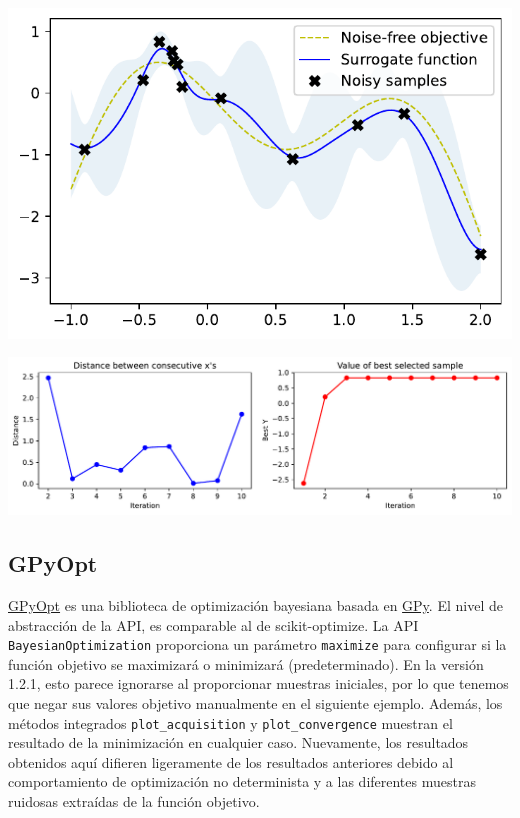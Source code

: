 \documentclass[
  12pt,
  letterpaper,
  DIV=11,
  numbers=noendperiod]{scrartcl}
\begin{document}
\includegraphics{ProyFinal_OptBayesiana_2024_files/figure-pdf/cell-8-output-1.pdf}

\includegraphics{ProyFinal_OptBayesiana_2024_files/figure-pdf/cell-9-output-1.pdf}

\subsection{GPyOpt}\label{gpyopt}

\href{http://sheffieldml.github.io/GPyOpt/}{GPyOpt} es una biblioteca de
optimización bayesiana basada en
\href{https://sheffieldml.github.io/GPy/}{GPy}. El nivel de abstracción
de la API, es comparable al de scikit-optimize. La API
\texttt{BayesianOptimization} proporciona un parámetro \texttt{maximize}
para configurar si la función objetivo se maximizará o minimizará
(predeterminado). En la versión 1.2.1, esto parece ignorarse al
proporcionar muestras iniciales, por lo que tenemos que negar sus
valores objetivo manualmente en el siguiente ejemplo. Además, los
métodos integrados \texttt{plot\_acquisition} y
\texttt{plot\_convergence} muestran el resultado de la minimización en
cualquier caso. Nuevamente, los resultados obtenidos aquí difieren
ligeramente de los resultados anteriores debido al comportamiento de
optimización no determinista y a las diferentes muestras ruidosas
extraídas de la función objetivo.
\end{document}
